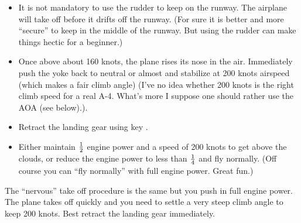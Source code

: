 \begin{itemize}
  \item It is not mandatory to use the rudder to keep on the runway. The airplane will take off before it drifts off the runway. (For sure it is better and more ``secure'' to keep in the middle of the runway. But using the rudder can make things hectic for a beginner.) 
  \item Once above about 160 knots, the plane rises its nose in the air. Immediately push the yoke back to neutral or almost and stabilize at 200 knots airspeed (which makes a fair climb angle) (I've no idea whether 200 knots is the right climb speed for a real A-4. What's more I suppose one should rather use the AOA (see below).).
  \item Retract the landing gear using key  .
  \item Either maintain $1\over2$ engine power and a speed of 200 knots to get above the clouds, or reduce the engine power to less than $1\over4$ and fly normally. (Off course you can ``fly normally'' with full engine power. Great fun.)
\end{itemize}

The ``nervous'' take off procedure is the same but you push in full
engine power. The plane takes off quickly and you need to settle a very
steep climb angle to keep 200 knots. Best retract the landing gear
immediately.

